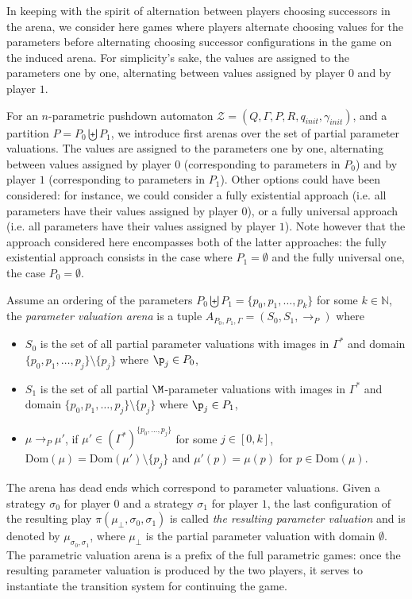 \documentclass[a4paper,UKenglish,cleveref, autoref, thm-restate]{lipics-v2021}
\newcommand{\N}{\mathbb{N}}
\begin{document}
In keeping with the spirit of alternation between players choosing successors in the arena, we consider here games where players
alternate choosing values for the parameters before alternating choosing successor configurations in the game on the induced arena.
For simplicity's sake, the values are assigned to the parameters one by one, alternating between values assigned by player $0$ and by player $1$.

For an  $n$-parametric pushdown automaton 
$\mathcal{Z}= (Q, \Gamma, P, R, q_{init}, \gamma_{init})$,
and a partition
$P = P_0 \biguplus P_1$,
we introduce first arenas over the set of partial parameter valuations. The values are assigned to the parameters one by one, alternating between values assigned by player $0$ (corresponding to parameters in $P_0$) and by player $1$ (corresponding to parameters in $P_1$). Other options could have been considered: for instance, we could consider a fully existential approach 
(i.e. all parameters have their values assigned by player $0$), 
or a fully universal approach
(i.e. all parameters have their values assigned by player $1$). 
Note however that the approach considered here encompasses both of the latter approaches:
the fully existential approach consists in the case where $P_1 = \emptyset$ and
the fully universal one, the case $P_0 = \emptyset$.


Assume an ordering of the parameters $P_0 \biguplus P_1 = \{p_0, p_1, \ldots, p_k \}$ for some 
 $k \in \N$, the {\em parameter valuation arena} is a tuple $A_{P_0,P_1,\Gamma} = (S_0, S_1, \rightarrow_P)$ where
\begin{itemize}

\item $S_0$ is the set of all partial parameter valuations with images in $\Gamma^*$ and domain $\{p_0, p_1, \ldots, p_{j}\} \setminus \{p_j\}$ where $\p_j \in P_0$,

\item $S_1$ is the set of all partial $\M$-parameter valuations  with images in $\Gamma^*$ and  domain $\{p_0, p_1, \ldots, p_{j}\} \setminus \{p_j\}$ where $\p_j \in P_1$,

\item
$ \mu \rightarrow_P \mu'$,
if $\mu' \in (\Gamma^*)^{\{p_0, \ldots, p_j\}}$ for some $j \in [0,k]$,
$\text{Dom}(\mu) = \text{Dom}(\mu') \setminus \{p_j\}$
and
 $\mu'(p) = \mu(p)$ for $p \in \text{Dom}(\mu)$. \label{parametric arena}
\end{itemize}


The arena has dead ends which correspond to parameter valuations.
Given a strategy $\sigma_0$ for player $0$ and a strategy $\sigma_1 $ for player $1$,
the last configuration of the resulting play $\pi(\mu_\bot,\sigma_0, \sigma_1)$
is called {\em the resulting parameter valuation}
 and is denoted by $\mu_{\sigma_0, \sigma_1}$, where 
 $\mu_\bot$ is the partial parameter valuation with domain $\emptyset$. 
The parametric valuation arena is a prefix of the full parametric games: once the resulting parameter valuation is produced by the two players, it serves to instantiate the transition system for continuing the game.
%
%
\end{document}
